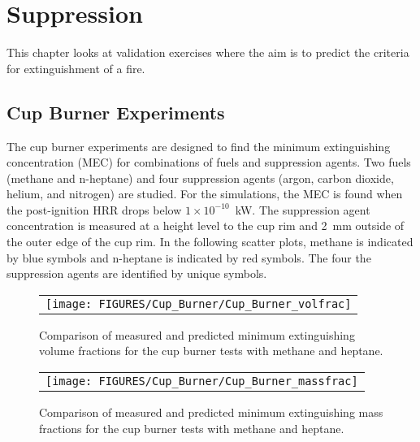 
\chapter{Suppression}

This chapter looks at validation exercises where the aim is to predict the criteria for extinguishment of a fire.

\section{Cup Burner Experiments}

The cup burner experiments are designed to find the minimum extinguishing concentration (MEC) for combinations of fuels and suppression agents. Two fuels (methane and n-heptane) and four suppression agents (argon, carbon dioxide, helium, and nitrogen) are studied. For the simulations, the MEC is found when the post-ignition HRR drops below $1 \times 10^{-10}$~kW. The suppression agent concentration is measured at a height level to the cup rim and 2~mm outside of the outer edge of the cup rim. In the following scatter plots, methane is indicated by blue symbols and n-heptane is indicated by red symbols. The four the suppression agents are identified by unique symbols.

\newpage

\begin{figure}[h!]
\begin{center}
\begin{tabular}{c}
\texttt{[image: FIGURES/Cup\_Burner/Cup\_Burner\_volfrac]}
\end{tabular}
\end{center}
\label{cup_burner_extinguish_vol}
\caption[Comparison of measured and predicted minimum extinguishing concentrations for the cup burner tests with methane and heptane]{Comparison of measured and predicted minimum extinguishing volume fractions for the cup burner tests with methane and heptane.}
\end{figure}


\begin{figure}[h!]
\begin{center}
\begin{tabular}{c}
\texttt{[image: FIGURES/Cup\_Burner/Cup\_Burner\_massfrac]}
\end{tabular}
\end{center}
\label{cup_burner_extinguish_mass}
\caption[Comparison of measured and predicted minimum extinguishing concentrations for the cup burner tests with methane and heptane]{Comparison of measured and predicted minimum extinguishing mass fractions for the cup burner tests with methane and heptane.}
\end{figure}

